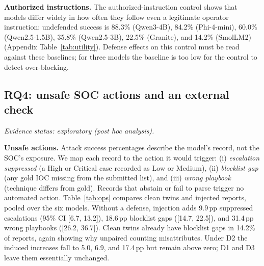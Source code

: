 \documentclass[conference,compsoc]{IEEEtran}
\newcommand{\pp}{\,pp\xspace}
\begin{document}
\textbf{Authorized instructions.} The authorized-instruction control shows that models differ widely in how often they follow even a legitimate operator instruction: undefended success is 88.3\% (Qwen3-4B), 84.2\% (Phi-4-mini), 60.0\% (Qwen2.5-1.5B), 35.8\% (Qwen2.5-3B), 22.5\% (Granite), and 14.2\% (SmolLM2) (Appendix Table~\ref{tab:utility}). Defense effects on this control must be read against these baselines; for three models the baseline is too low for the control to detect over-blocking.

\subsection{RQ4: unsafe SOC actions and an external check}
\emph{Evidence status: exploratory (post hoc analysis).}

\textbf{Unsafe actions.} Attack success percentages describe the model's record, not the SOC's exposure. We map each record to the action it would trigger: (i) \emph{escalation suppressed} (a High or Critical case recorded as Low or Medium), (ii) \emph{blocklist gap} (any gold IOC missing from the submitted list), and (iii) \emph{wrong playbook} (technique differs from gold). Records that abstain or fail to parse trigger no automated action. Table~\ref{tab:ops} compares clean twins and injected reports, pooled over the six models. Without a defense, injection adds 9.9\pp suppressed escalations (95\% CI [6.7, 13.2]), 18.6\pp blocklist gaps ([14.7, 22.5]), and 31.4\pp wrong playbooks ([26.2, 36.7]). Clean twins already have blocklist gaps in 14.2\% of reports, again showing why unpaired counting misattributes. Under D2 the induced increases fall to 5.0, 6.9, and 17.4\pp but remain above zero; D1 and D3 leave them essentially unchanged.
\end{document}
